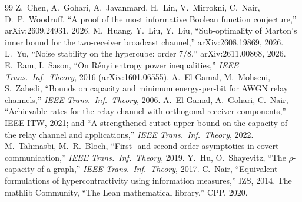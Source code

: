 \documentclass[11pt]{article}
\begin{document}
\begin{thebibliography}{99}\small
{} Z.~Chen, A.~Gohari, A.~Javanmard, H.~Lin, V.~Mirrokni, C.~Nair, D.~P.~Woodruff,
``A proof of the most informative Boolean function conjecture,'' arXiv:2609.24931, 2026.
 M.~Huang, Y.~Liu, Y.~Liu, ``Sub-optimality of Marton's inner bound for the
two-receiver broadcast channel,'' arXiv:2608.19869, 2026.
 L.~Yu, ``Noise stability on the hypercube: order $7/8$,'' arXiv:2611.00868, 2026.
 E.~Ram, I.~Sason, ``On R\'enyi entropy power inequalities,'' \emph{IEEE Trans.\
Inf.\ Theory}, 2016 (arXiv:1601.06555).
 A.~El Gamal, M.~Mohseni, S.~Zahedi, ``Bounds on capacity and minimum
energy-per-bit for AWGN relay channels,'' \emph{IEEE Trans.\ Inf.\ Theory}, 2006.
\bibitem{egn} A.~El Gamal, A.~Gohari, C.~Nair, ``Achievable rates for the relay channel with
orthogonal receiver components,'' IEEE ITW, 2021; and ``A strengthened cutset upper bound on
the capacity of the relay channel and applications,'' \emph{IEEE Trans.\ Inf.\ Theory}, 2022.
\bibitem{tb} M.~Tahmasbi, M.~R.~Bloch, ``First- and second-order asymptotics in covert
communication,'' \emph{IEEE Trans.\ Inf.\ Theory}, 2019.
 Y.~Hu, O.~Shayevitz, ``The $\rho$-capacity of a graph,'' \emph{IEEE Trans.\ Inf.\
Theory}, 2017.
\bibitem{nair} C.~Nair, ``Equivalent formulations of hypercontractivity using information
measures,'' IZS, 2014.
\bibitem{mathlib} The mathlib Community, ``The Lean mathematical library,'' CPP, 2020.
\end{thebibliography}
\end{document}
